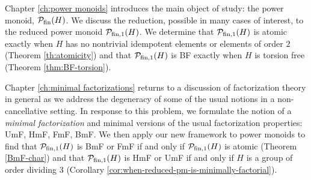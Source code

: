 
Chapter \ref{ch:power monoids} introduces the main object of study: the power monoid, $\mathcal{P}_{\textrm{fin}}(H)$.
We discuss the reduction, possible in many cases of interest, to the reduced power monoid $\mathcal{P}_{\textrm{fin}, 1}(H)$.
We determine that $\mathcal{P}_{\textrm{fin}, 1}(H)$ is atomic exactly when $H$ has no nontrivial idempotent elements or elements of order $2$ (Theorem \ref{th:atomicity}) and that $\mathcal{P}_{\textrm{fin}, 1}(H)$ is BF exactly when $H$ is torsion free (Theorem \ref{thm:BF-torsion}).


Chapter \ref{ch:minimal factorizations} returns to a discussion of factorization theory in general as we address the degeneracy of some of the usual notions in a non-cancellative setting.  
In response to this problem, we formulate the notion of a \textit{minimal factorization} and minimal versions of the usual factorization properties: UmF, HmF, FmF, BmF.
We then apply our new framework to power monoids to find that $\mathcal{P}_{\textrm{fin}, 1}(H)$ is BmF or FmF if and only if $\mathcal{P}_{\textrm{fin}, 1}(H)$ is atomic (Theorem \ref{BmF-char}) and that $\mathcal{P}_{\textrm{fin}, 1}(H)$ is HmF or UmF if and only if $H$ is a group of order dividing $3$ (Corollary \ref{cor:when-reduced-pm-is-minimally-factorial}).

